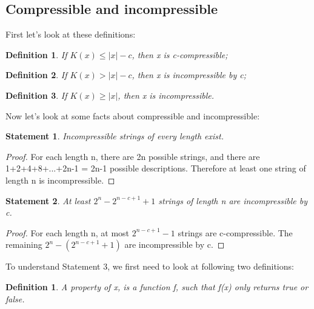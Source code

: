 \documentclass[12pt]{article}
\begin{document}
\subsection{Compressible and incompressible}
First let's look at these definitions:\\

\newtheorem{mydef}{Definition}
\begin{mydef}
If $K(x) \leq |x| - c$,
    then x is c-compressible;\\
\end{mydef}


\begin{mydef}
If $K(x) > |x| - c$,
    then x is incompressible by c;\\
\end{mydef}


\begin{mydef}
If $K(x) \geq |x|$,
    then x is incompressible.\\
\end{mydef}


Now let's look at some facts about compressible and incompressible:\\

\newtheorem{mydef2}{Statement}
\begin{mydef2}
Incompressible strings of every length exist.\\
\end{mydef2}

\begin{proof}
For each length n, there are 2n possible strings, 
and there are 1+2+4+8+...+2n-1 = 2n-1 possible descriptions.
Therefore at least one string of length n is incompressible.
\end{proof}


\begin{mydef2}
At least $2^n - 2^{n-c+1} + 1$ strings of length n are incompressible by c.
\end{mydef2}

\begin{proof}
For each length n, at most $2^{n-c+1} - 1$ strings are 
c-compressible. The remaining $2^n - (2^{n-c+1} + 1)$ are incompressible by c.
\end{proof}

To understand Statement 3, we first need to look at following two definitions:
\newtheorem{mydef3}{Definition}
\begin{mydef3}
A property of x, is a function f, such that f(x) only returns true or false.
\end{mydef3}
\end{document}

